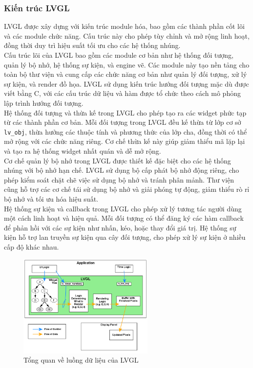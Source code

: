 \subsubsection{Kiến trúc LVGL}
\tab LVGL được xây dựng với kiến trúc module hóa, bao gồm các thành phần cốt lõi và các module chức năng. Cấu trúc này cho phép tùy chỉnh và mở rộng linh hoạt, đồng thời duy trì hiệu suất tối ưu cho các hệ thống nhúng.\\
\tab Cấu trúc lõi của LVGL bao gồm các module cơ bản như hệ thống đối tượng, quản lý bộ nhớ, hệ thống sự kiện, và engine vẽ. Các module này tạo nền tảng cho toàn bộ thư viện và cung cấp các chức năng cơ bản như quản lý đối tượng, xử lý sự kiện, và render đồ họa. LVGL sử dụng kiến trúc hướng đối tượng mặc dù được viết bằng C, với các cấu trúc dữ liệu và hàm được tổ chức theo cách mô phỏng lập trình hướng đối tượng.\\
\tab Hệ thống đối tượng và thừa kế trong LVGL cho phép tạo ra các widget phức tạp từ các thành phần cơ bản. Mỗi đối tượng trong LVGL đều kế thừa từ lớp cơ sở \texttt{lv\_obj}, thừa hưởng các thuộc tính và phương thức của lớp cha, đồng thời có thể mở rộng với các chức năng riêng. Cơ chế thừa kế này giúp giảm thiểu mã lặp lại và tạo ra hệ thống widget nhất quán và dễ mở rộng.\\
\tab Cơ chế quản lý bộ nhớ trong LVGL được thiết kế đặc biệt cho các hệ thống nhúng với bộ nhớ hạn chế. LVGL sử dụng bộ cấp phát bộ nhớ động riêng, cho phép kiểm soát chặt chẽ việc sử dụng bộ nhớ và tránh phân mảnh. Thư viện cũng hỗ trợ các cơ chế tái sử dụng bộ nhớ và giải phóng tự động, giảm thiểu rò rỉ bộ nhớ và tối ưu hóa hiệu suất.\\
\tab Hệ thống sự kiện và callback trong LVGL cho phép xử lý tương tác người dùng một cách linh hoạt và hiệu quả. Mỗi đối tượng có thể đăng ký các hàm callback để phản hồi với các sự kiện như nhấn, kéo, hoặc thay đổi giá trị. Hệ thống sự kiện hỗ trợ lan truyền sự kiện qua cây đối tượng, cho phép xử lý sự kiện ở nhiều cấp độ khác nhau.
\begin{figure}[H]
  \centering
  \includegraphics[width=0.6\textwidth]{Images/LGVL_intro_data_flow.png}
  \caption{Tổng quan về luồng dữ liệu của LVGL}
\end{figure}
